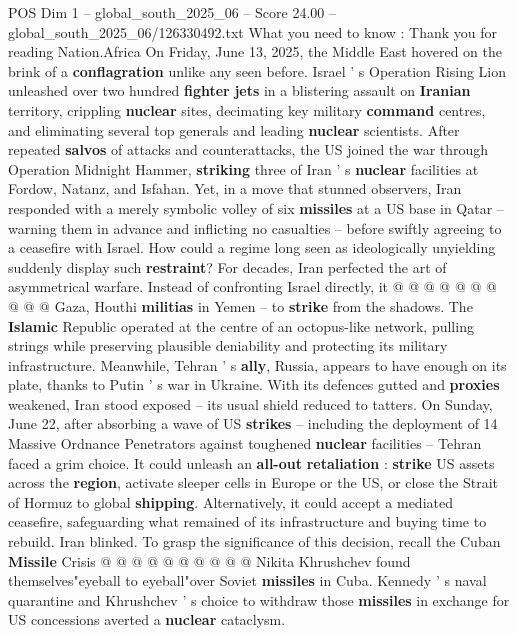 \begin{textsample}{POS Dim 1 – global\_south\_2025\_06 – Score 24.00 – global\_south\_2025\_06/126330492.txt}  \label{ex:f1_pos_213}
What you need to know : Thank you for reading Nation.Africa On Friday, June 13, 2025, the Middle East hovered on the brink of a \textbf{conflagration} unlike any seen before.
Israel ' s Operation Rising Lion unleashed over two hundred \textbf{fighter} \textbf{jets} in a blistering assault on \textbf{Iranian} territory, crippling \textbf{nuclear} sites, decimating key military \textbf{command} centres, and eliminating several top generals and leading \textbf{nuclear} scientists.
After repeated \textbf{salvos} of attacks and counterattacks, the US joined the war through Operation Midnight Hammer, \textbf{striking} three of Iran ' s \textbf{nuclear} facilities at Fordow, Natanz, and Isfahan.
Yet, in a move that stunned observers, Iran responded with a merely symbolic volley of six \textbf{missiles} at a US base in Qatar -- warning them in advance and inflicting no casualties -- before swiftly agreeing to a ceasefire with Israel.
How could a regime long seen as ideologically unyielding suddenly display such \textbf{restraint}?
For decades, Iran perfected the art of asymmetrical warfare.
Instead of confronting Israel directly, it @ @ @ @ @ @ @ @ @ @ Gaza, Houthi \textbf{militias} in Yemen -- to \textbf{strike} from the shadows.
The \textbf{Islamic} Republic operated at the centre of an octopus-like network, pulling strings while preserving plausible deniability and protecting its military infrastructure.
Meanwhile, Tehran ' s \textbf{ally}, Russia, appears to have enough on its plate, thanks to Putin ' s war in Ukraine.
With its defences gutted and \textbf{proxies} weakened, Iran stood exposed -- its usual shield reduced to tatters.
On Sunday, June 22, after absorbing a wave of US \textbf{strikes} -- including the deployment of 14 Massive Ordnance Penetrators against toughened \textbf{nuclear} facilities -- Tehran faced a grim choice.
It could unleash an \textbf{all-out} \textbf{retaliation} : \textbf{strike} US assets across the \textbf{region}, activate sleeper cells in Europe or the US, or close the Strait of Hormuz to global \textbf{shipping}.
Alternatively, it could accept a mediated ceasefire, safeguarding what remained of its infrastructure and buying time to rebuild.
Iran blinked.
To grasp the significance of this decision, recall the Cuban \textbf{Missile} Crisis @ @ @ @ @ @ @ @ @ @ Nikita Khrushchev found themselves"eyeball to eyeball"over Soviet \textbf{missiles} in Cuba.
Kennedy ' s naval quarantine and Khrushchev ' s choice to withdraw those \textbf{missiles} in exchange for US concessions averted a \textbf{nuclear} cataclysm.

\end{textsample}
